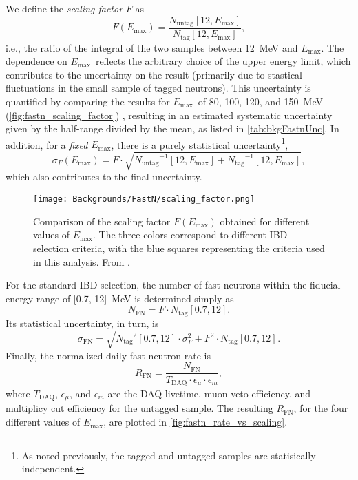 \documentclass[../thesis.tex]{subfiles}
\begin{document}
\def\emax{\ensuremath{E_\mathrm{max}}} \def\ntag{\ensuremath{N_\mathrm{tag}}}
\def\nuntag{\ensuremath{N_\mathrm{untag}}}

We define the \emph{scaling factor} $F$ as
\begin{equation}
  F(\emax) = \frac{\nuntag[12, \emax]}{\ntag[12, \emax]},
\end{equation}
i.e., the ratio of the integral of the two samples between 12~MeV and \emax. The dependence on \emax\ reflects the arbitrary choice of the upper energy limit, which contributes to the uncertainty on the result (primarily due to stastical fluctuations in the small sample of tagged neutrons). This uncertainty is quantified by comparing the results for \emax\ of 80, 100, 120, and 150~MeV (\autoref{fig:fastn_scaling_factor}) \cite{fastn} , resulting in an estimated systematic uncertainty given by the half-range divided by the mean, as listed in \autoref{tab:bkgFastnUnc}. In addition, for a \emph{fixed} \emax, there is a purely statistical uncertainty\footnote{As noted previously, the tagged and untagged samples are statisically independent.},
\begin{equation}
  \sigma_F(\emax) = F \cdot \sqrt{\nuntag^{-1}[12, \emax] + \ntag^{-1}[12,
      \emax]},
\end{equation}
which also contributes to the final uncertainty.

\begin{figure}[h]
  \texttt{[image: Backgrounds/FastN/scaling\_factor.png]}
  \caption{Comparison of the scaling factor $F(E_{\mathrm{max}})$ obtained for different values of $E_{\mathrm{max}}$. The three colors correspond to different IBD selection criteria, with the blue squares representing the criteria used in this analysis. From \cite{fastn}.}
  \label{fig:fastn_scaling_factor}
\end{figure}

\def\nfn{\ensuremath{N_\mathrm{FN}}} \def\rfn{\ensuremath{R_\mathrm{FN}}}

For the standard IBD selection, the number of fast neutrons within the fiducial energy range of [0.7, 12]~MeV is determined simply as
\begin{equation}
  \nfn = F \cdot \ntag[0.7, 12].
\end{equation}
Its statistical uncertainty, in turn, is
\begin{equation}
  \label{eq:fastn_scal_unc}
  \sigma_\mathrm{FN} = \sqrt{\ntag^2[0.7, 12]
    \cdot \sigma_F^2 + F^2 \cdot \ntag[0.7, 12]}.
\end{equation}
Finally, the normalized daily fast-neutron rate is
\begin{equation}
  \label{eq:fastn_rate}
  \rfn = \frac{\nfn}{T_\mathrm{DAQ} \cdot \epsilon_\mu \cdot \epsilon_m},
\end{equation}
where $T_\mathrm{DAQ}$, $\epsilon_\mu$, and $\epsilon_m$ are the DAQ livetime, muon veto efficiency, and multiplicy cut efficiency for the untagged sample. The resulting $\rfn$, for the four different values of $E_{\mathrm{max}}$, are plotted in \autoref{fig:fastn_rate_vs_scaling}.
\end{document}

